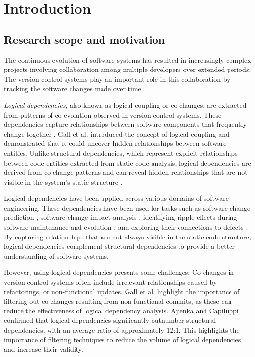 \chapter{Introduction}
\section{Research scope and motivation}


\hspace{4em}The continuous evolution of software systems has resulted in increasingly complex projects involving collaboration among multiple developers over extended periods. The version control systems play an important role in this collaboration by tracking the software changes made over time.

\textit{Logical dependencies}, also known as logical coupling or co-changes, are extracted from patterns of co-evolution observed in version control systems. These dependencies capture relationships between software components that frequently change together \cite{Zimmermann:2004:MVH:998675.999460}.
Gall et al. \cite{Gall:1998:DLC:850947.853338, Gall:2003:CRH:942803.943741} introduced the concept of logical coupling and demonstrated that it could uncover hidden relationships between software entities.
Unlike structural dependencies, which represent explicit relationships between code entities extracted from static code analysis, logical dependencies are derived from co-change patterns and can reveal hidden relationships that are not visible in the system's static structure \cite{Gall:1998:DLC:850947.853338, Gall:2003:CRH:942803.943741, Yu:2007:UCC:1231330.1231370}.


Logical dependencies have been applied across various domains of software engineering. These dependencies have been used for tasks such as software change prediction \cite{Zimmermann:2004:MVH:998675.999460, Moonen-commit, article-Moonen}, software change impact analysis \cite{1553643}, identifying ripple effects during software maintenance and evolution \cite{DBLP:conf/issre/OlivaG15, Oliva:2011:ISL:2067853.2068086, Poshyvanyk2009}, and exploring their connections to defects \cite{wiese, Zimmermann:2004:MVH:998675.999460}. By capturing relationships that are not always visible in the static code structure, logical dependencies complement structural dependencies to provide a better understanding of software systems.

However, using logical dependencies presents some challenges: Co-changes in version control systems often include irrelevant relationships caused by refactorings, or non-functional updates. Gall et al. \cite{Gall:1998:DLC:850947.853338, Gall:2003:CRH:942803.943741} highlight the importance of filtering out co-changes resulting from non-functional commits, as these can reduce the effectiveness of logical dependency analysis. Ajienka and Capiluppi \cite{DBLP:journals/jss/AjienkaC17} confirmed that logical dependencies significantly outnumber structural dependencies, with an average ratio of approximately 12:1. This highlights the importance of filtering techniques to reduce the volume of logical dependencies and increase their validity.

